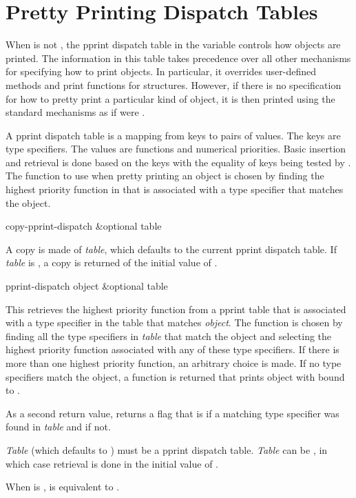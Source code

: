 \section{Pretty Printing Dispatch Tables}

When  is not , the pprint dispatch table in the variable
 controls how objects are printed.  The information
in this table takes precedence over all other mechanisms for specifying how
to print objects.  In particular, it overrides user-defined 
methods and print functions for structures.  However, if there is no
specification for how to pretty print a particular kind of object, it is then
printed using the standard mechanisms as if  were .

A pprint dispatch table is a mapping from keys to pairs of values.  The keys
are type specifiers.  The values are functions and numerical priorities.
Basic insertion and retrieval is done based on the keys with the equality
of keys being tested by .  The function to use when pretty printing an
object is chosen by finding the highest priority function in
 that is associated with a type specifier that
matches the object.

\begin{defun}[Function]
copy-pprint-dispatch &optional table 

A copy is made of {\it table}, which defaults to the current pprint dispatch
table.  If {\it table} is , a copy is returned of the initial value of
.
\end{defun}

\begin{defun}[Function]
pprint-dispatch object &optional table 

This retrieves the highest priority function from a pprint table that is
associated with a type specifier in the table that matches {\it object}.
The function is chosen by finding all the type specifiers in {\it table}
that match the object and selecting the highest priority function
associated with any of these type specifiers.  If there is more than one
highest priority function, an arbitrary choice is made.  If no type
specifiers match the object, a function is returned that prints object with
 bound to .

As a second return value,  returns a flag that is  if a
matching type specifier was found in {\it table} and  if not.

{\it Table} (which defaults to ) must be a
pprint dispatch table.  {\it Table} can be , in which case
retrieval is done in the initial value of .

When  is ,  is equivalent to
.
\end{defun}

